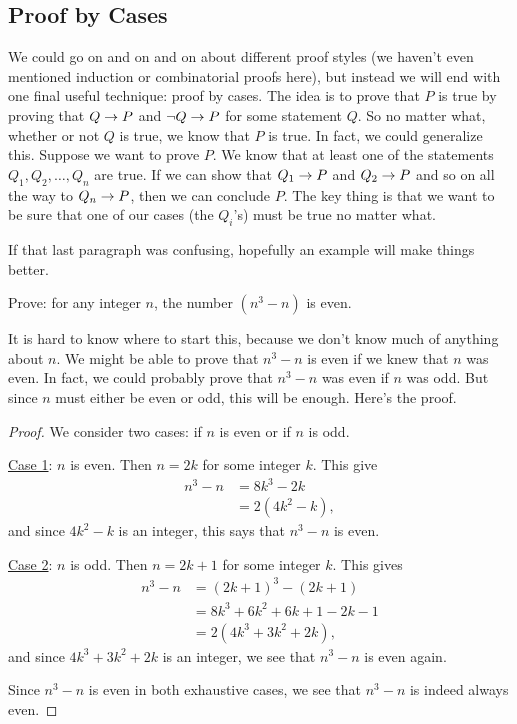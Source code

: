 \documentclass[12pt]{article}
\begin{document}
\subsection*{Proof by Cases}

We could go on and on and on about different proof styles (we haven't even mentioned induction or combinatorial proofs here), but instead we will end with one final useful technique: proof by cases.  The idea is to prove that $P$ is true by proving that $Q \rightarrow P$ and $\neg Q \rightarrow P$ for some statement $Q$.  So no matter what, whether or not $Q$ is true, we know that $P$ is true.  In fact, we could generalize this.  Suppose we want to prove $P$.  We know that at least one of the statements $Q_1, Q_2, \ldots, Q_n$ are true.  If we can show that $Q_1 \rightarrow P$ and $Q_2 \rightarrow P$ and so on all the way to $Q_n \rightarrow P$, then we can conclude $P$.  The key thing is that we want to be sure that one of our cases (the $Q_i$'s) must be true no matter what.

If that last paragraph was confusing, hopefully an example will make things better.

\begin{example}
Prove: for any integer $n$, the number $(n^3 -n)$ is even.

\begin{solution}
It is hard to know where to start this, because we don't know much of anything about $n$.  We might be able to prove that $n^3 - n$ is even if we knew that $n$ was even.  In fact, we could probably prove that $n^3-n$ was even if $n$ was odd.  But since $n$ must either be even or odd, this will be enough.  Here's the proof.

\begin{proof}
We consider two cases: if $n$ is even or if $n$ is odd.

\underline{Case 1}: $n$ is even.  Then $n = 2k$ for some integer $k$.  This give
\begin{align*}
n^3 - n & = 8k^3 - 2k \\
& = 2(4k^2 - k),
\end{align*}
 and since $4k^2 - k$ is an integer, this says that $n^3-n$ is even.

 \underline{Case 2}: $n$ is odd.  Then $n = 2k+1$ for some integer $k$.  This gives
 \begin{align*}
 n^3 - n & = (2k+1)^3 - (2k+1) \\
 & = 8k^3 + 6k^2 + 6k + 1 - 2k - 1 \\
 & = 2(4k^3 + 3k^2 + 2k),
 \end{align*}
  and since $4k^3 + 3k^2 + 2k$ is an integer, we see that $n^3 - n$ is even again.

  Since $n^3 - n$ is even in both exhaustive cases, we see that $n^3 - n$ is indeed always even.
\end{proof}
\end{solution}


\end{example}
\end{document}
